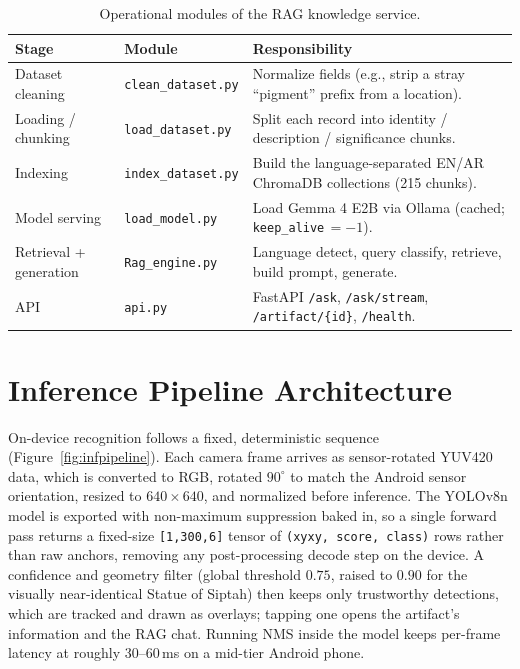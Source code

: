 \begin{table}[htbp]
\centering
\caption{Operational modules of the RAG knowledge service.}
\label{tab:ragmodules}
\begin{tabularx}{\textwidth}{@{}llX@{}}
\toprule
\textbf{Stage} & \textbf{Module} & \textbf{Responsibility}\\
\midrule
Dataset cleaning      & \texttt{clean\_dataset.py} & Normalize fields (e.g., strip a stray ``pigment'' prefix from a location).\\
Loading / chunking    & \texttt{load\_dataset.py}  & Split each record into identity / description / significance chunks.\\
Indexing              & \texttt{index\_dataset.py} & Build the language-separated EN/AR ChromaDB collections (215 chunks).\\
Model serving         & \texttt{load\_model.py}    & Load Gemma 4 E2B via Ollama (cached; \texttt{keep\_alive}\,$=-1$).\\
Retrieval + generation& \texttt{Rag\_engine.py}    & Language detect, query classify, retrieve, build prompt, generate.\\
API                   & \texttt{api.py}            & FastAPI \texttt{/ask}, \texttt{/ask/stream}, \texttt{/artifact/\{id\}}, \texttt{/health}.\\
\bottomrule
\end{tabularx}
\end{table}

\section{Inference Pipeline Architecture}

On-device recognition follows a fixed, deterministic sequence
(Figure~\ref{fig:infpipeline}). Each camera frame arrives as sensor-rotated YUV420
data, which is converted to RGB, rotated $90^{\circ}$ to match the Android sensor
orientation, resized to $640\times640$, and normalized before inference. The YOLOv8n
model is exported with non-maximum suppression baked in, so a single forward pass
returns a fixed-size \texttt{[1,300,6]} tensor of \texttt{(xyxy, score, class)} rows
rather than raw anchors, removing any post-processing decode step on the device. A
confidence and geometry filter (global threshold $0.75$, raised to $0.90$ for the
visually near-identical Statue of Siptah) then keeps only trustworthy detections, which
are tracked and drawn as overlays; tapping one opens the artifact's information and the
RAG chat. Running NMS inside the model keeps per-frame latency at roughly
30--60\,ms on a mid-tier Android phone.

